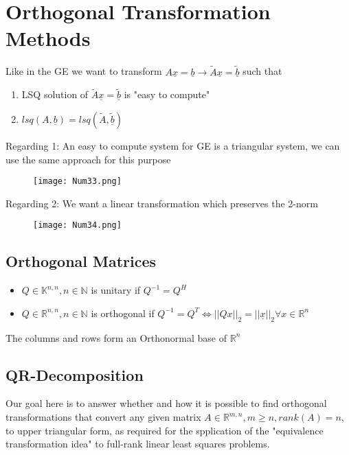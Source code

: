 \documentclass[8pt]{extreport}
\begin{document}
\section{Orthogonal Transformation Methods} 

Like in the GE we want to transform $A\underline{x} = \underline{b} \rightarrow \tilde{A}\underline{x} = \tilde{\underline{b}}$ such that
\begin{enumerate}
\item LSQ solution of $ \tilde{A}\underline{x} = \tilde{\underline{b}}$ is "easy to compute"
\item $lsq(A,\underline{b}) = lsq(\tilde{A},\tilde{\underline{b}})$
\end{enumerate}

Regarding 1: An easy to compute system for GE is a triangular system, we can use the same approach for this purpose
\begin{figure}[H]
\centering
\texttt{[image: Num33.png]}
\end{figure}

Regarding 2: We want a linear transformation which preserves the 2-norm
\begin{figure}[H]
\centering
\texttt{[image: Num34.png]}
\end{figure}

\subsection{Orthogonal Matrices}
\begin{itemize}
\item $Q \in \mathbb{K}^{n,n}, n \in \mathbb{N}$ is unitary if $Q^{-1} = Q^H$
\item $Q \in \mathbb{R}^{n,n}, n \in \mathbb{N}$ is orthogonal if $Q^{-1} = Q^T \iff ||Qx||_2 = ||\underline{x}||_2 \forall x \in \mathbb{R}^n$
\end{itemize}
The columns and rows form an Orthonormal base of $\mathbb{R}^n$

\subsection{QR-Decomposition}

Our goal here is to answer whether and how it is possible to find orthogonal transformations that convert any given matrix $A \in \mathbb{R}^{m,n}, m \geq n, rank(A) = n$, to upper triangular form, as required for the spplication of the "equivalence transformation idea" to full-rank linear least squares problems.
\end{document}
